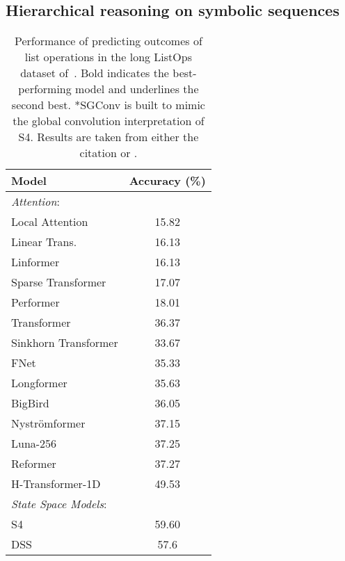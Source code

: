 \documentclass{article}
\theoremstyle{plain}
\theoremstyle{definition}
\theoremstyle{remark}
\begin{document}
\subsection{Hierarchical reasoning on symbolic sequences}
\label{sec:listops}

\begin{table}[t] 
    \centering
    \vspace{-0.08in}
    \caption{Performance of predicting outcomes of list operations in the long ListOps dataset of~\citet{tay2021long}.  Bold indicates the best-performing model and underlines the second best. *SGConv is built to mimic the global convolution interpretation of S4. Results are taken from either the citation or \citet{hasani2022liquid}.}
     \label{tab:listops}
    \vskip 0.1in
    \begin{small}
\begin{tabular}{lc}
    \toprule
    Model & Accuracy (\%)  \\
    \midrule
    \emph{Attention}: & \\
    Local Attention \citep{tay2021long} & 15.82 \\
    Linear Trans. \citep{katharopoulos2020transformers}& 16.13  \\
    Linformer \citep{wang2020linformer} & 16.13 \\
    Sparse Transformer \citep{child2019generating} & 17.07 \\
    Performer  \citep{choromanski2020rethinking} & 18.01  \\
    Transformer \citep{vaswani2017attention} & 36.37  \\
    Sinkhorn Transformer \citep{tay2020sparse} & 33.67  \\
    FNet \citep{lee2022fnet} & 35.33  \\
    Longformer \citep{beltagy2020longformer}  & 35.63 \\
    BigBird \citep{zaheer2020big} & 36.05	 \\
    Nyströmformer \citep{xiong2021nystromformer} & 37.15  \\
    Luna-256 \cite{ma2021luna} & 37.25  \\
    Reformer \citep{kitaev2020reformer} & 37.27  \\
    H-Transformer-1D \citep{zhu2021h} & 49.53 \\
    \midrule
    \emph{State Space Models}: & \\
    S4 \citep{guparameterization} & 59.60  \\
    DSS \citep{gupta2022diagonal} & 57.6  \\

\end{tabular}
\end{small}
\end{table}
\end{document}
